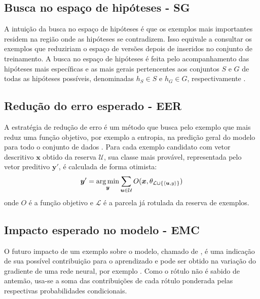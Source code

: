 \subsection{Busca no espaço de hipóteses - SG}\label{sgnet}
A intuição da busca no espaço de hipóteses é que os exemplos mais importantes
residem na região onde as hipóteses se contradizem.
Isso equivale a consultar os exemplos que reduziriam o espaço de versões
\citep{books/daglib/0087929} depois de inseridos no conjunto de treinamento.
A busca no espaço de hipóteses é feita pelo acompanhamento das hipóteses
mais específicas e as mais gerais pertencentes aos conjuntos $S$ e $G$ de todas
as hipóteses possíveis,
denominadas $h_S \in S$ e $h_G \in G$, respectivamente \cite{journals/ml/CohnAL94}.


\subsection{Redução do erro esperado - EER}
A estratégia de redução de erro é um método que busca pelo exemplo que mais
reduz uma função objetivo, por exemplo a entropia, na predição geral do modelo 
para todo o conjunto de dados \citep{conf/ijcai/GuoG07}.
Para cada exemplo candidato com vetor descritivo $\bm{x}$
obtido da reserva $\mathcal{U}$, sua classe mais provável,
representada pelo vetor preditivo $\bm{y}'$, é calculada de forma
otimista:
\begin{equation}
 \bm{y}' = \operatorname*{arg\,min}_{\bm{y}}{\sum_{\bm{u} \in \mathcal{U}} O(\bm{x}, \theta_{\mathcal{L}\cup
\{\langle\bm{u},y\rangle\}})}
\end{equation}
onde $O$ é a função objetivo e $\mathcal{L}$ é a parcela já rotulada da reserva de
exemplos.

\subsection{Impacto esperado no modelo - EMC}
O futuro impacto de um exemplo sobre o modelo,
chamado de ,
é uma indicação de sua possível contribuição para o aprendizado e
pode ser obtido na variação do gradiente de uma rede neural, por exemplo
\cite{conf/nips/SettlesCR07}.
Como o rótulo não é sabido de antemão,
usa-se a soma das contribuições de cada rótulo ponderada pelas respectivas
probabilidades condicionais.

